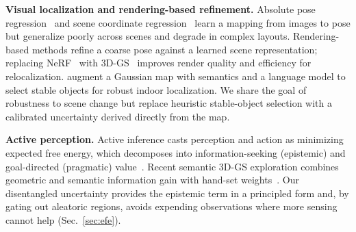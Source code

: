\iffalse

\textbf{Visual localization and rendering-based refinement.} Absolute pose
regression~\cite{chen2024marepo} and scene coordinate
regression~\cite{brachmann2023ace} learn a mapping from images to pose but
generalize poorly across scenes and degrade in complex layouts. Rendering-based
methods refine a coarse pose against a learned scene representation; replacing
NeRF~\cite{mildenhall2020nerf} with 3D-GS~\cite{kerbl2023} improves render
quality and efficiency for relocalization. \cite{chu2026semantic} augment a
Gaussian map with semantics and a language model to select stable objects for
robust indoor localization. We share the goal of robustness to scene change but
replace heuristic stable-object selection with a calibrated uncertainty derived
directly from the map.

\textbf{Active perception.} Active inference casts perception and action as
minimizing expected free energy, which decomposes into information-seeking
(epistemic) and goal-directed (pragmatic) value~\cite{friston2010,
parr2022active}. Recent semantic 3D-GS exploration combines geometric and
semantic information gain with hand-set weights~\cite{nagami2025vista}. Our
disentangled uncertainty
provides the epistemic term in a principled form and, by gating out aleatoric
regions, avoids expending observations where more sensing cannot help
(Sec.~\ref{sec:efe}).

